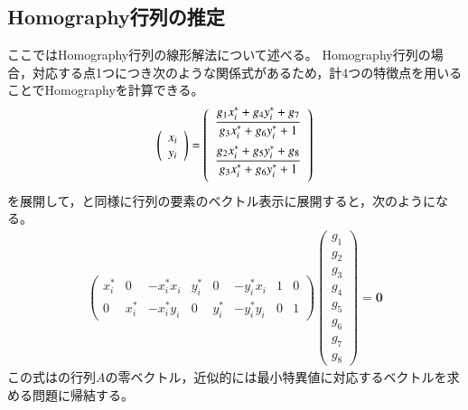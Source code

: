 \documentclass[fleqn]{jreport}
\begin{document}
\subsection{Homography行列の推定}
ここではHomography行列の線形解法について述べる。
Homography行列の場合，対応する点1つにつき次のような関係式があるため，計4つの特徴点を用いることでHomographyを計算できる。
\begin{align}
\left(
\begin{array}{c}
x_i\\
y_i 
\end{array}
\right)=\left(
\begin{array}{ccc}
\vspace{2mm}
\dfrac{g_{1}x^*_i+g_{4}y^*_i+g_{7}}{g_{3}x^*_i+g_{6}y^*_i+1} \\ \vspace{2mm}
\dfrac{g_{2}x^*_i+g_{5}y^*_i+g_{8}}{g_{3}x^*_i+g_{6}y^*_i+1} 
\end{array}
\right)\label{eq:HEquation}
\end{align}
を展開して，と同様に行列の要素のベクトル表示に展開すると，次のようになる。
\begin{align}
\begin{pmatrix}
x^*_i & 0 & -x^*_i x_i & y^*_i & 0 & -y^*_i x_i& 1 & 0  \\ 
0 & x^*_i & -x^*_i y_i & 0 & y^*_i & -y^*_i y_i& 0 & 1
\end{pmatrix} \begin{pmatrix}
g_1 \\ 
g_2 \\ 
g_3 \\ 
g_4 \\ 
g_5 \\ 
g_6 \\
g_7 \\
g_8
\end{pmatrix} = \bm{0} \label{eq:HEq2}
\end{align}
この式はの行列$A$の零ベクトル，近似的には最小特異値に対応するベクトルを求める問題に帰結する。
\end{document}
